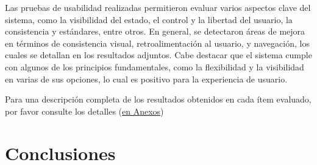 \documentclass[stu, 12pt, letterpaper, donotrepeattitle, floatsintext, natbib]{apa7}
\begin{document}
\noindent Las pruebas de usabilidad realizadas permitieron evaluar varios aspectos clave del sistema, como la visibilidad del estado, el control y la libertad del usuario, la consistencia y estándares, entre otros. En general, se detectaron áreas de mejora en términos de consistencia visual, retroalimentación al usuario, y navegación, los cuales se detallan en los resultados adjuntos. Cabe destacar que el sistema cumple con algunos de los principios fundamentales, como la flexibilidad y la visibilidad en varias de sus opciones, lo cual es positivo para la experiencia de usuario.

\noindent Para una descripción completa de los resultados obtenidos en cada ítem evaluado, por favor consulte los detalles (\hyperref[tab:reporte_usabilidad]{en Anexos})

\newpage
\section{Conclusiones}
\end{document}
